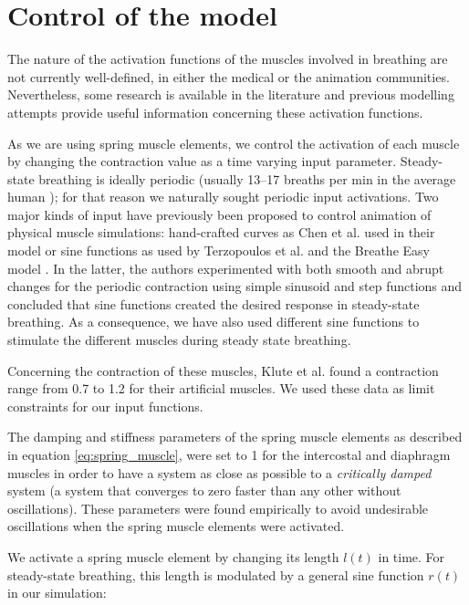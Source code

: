 \section{\label{sec:control_model}Control of the model}
The nature of the activation functions of the muscles involved in breathing are not currently well-defined, in either the medical or the animation communities. Nevertheless, some research is available in the literature and previous modelling attempts provide useful information concerning these activation functions.

As we are using spring muscle elements, we control the activation of each muscle by changing the contraction value as a time varying input parameter. Steady-state breathing is ideally periodic (usually 13--17 breaths per min in the average human \cite{slonim1987respiratory}); for that reason we naturally sought periodic input activations. Two major kinds of input have previously been proposed to control animation of physical muscle simulations: hand-crafted curves as Chen et al. \cite{chen1992pump} used in their model or sine functions as used by Terzopoulos et al. \cite{tu1994artificial} and the Breathe Easy model \cite{dilorenzo2009breathing}. In the latter, the authors experimented with both smooth and abrupt changes for the periodic contraction using simple sinusoid and step functions and concluded that sine functions created the desired response in steady-state breathing. As a consequence, we have also used different sine functions to stimulate the different muscles during steady state breathing.

Concerning the contraction of these muscles, Klute et al. \cite{klute2002artificial} found a contraction range from 0.7 to 1.2 for their artificial muscles. We used these data as limit constraints for our input functions.

The damping and stiffness parameters of the spring muscle elements as described in equation \ref{eq:spring_muscle}, were set to 1 for the intercostal and diaphragm muscles in order to have a system as close as possible to a \emph{critically damped} system (a system that converges to zero faster than any other without oscillations). These parameters were found empirically to avoid undesirable oscillations when the spring muscle elements were activated.

We activate a spring muscle element by changing its length $l(t)$ in time. For steady-state breathing, this length is modulated by a general sine function $r(t)$ in our simulation:

